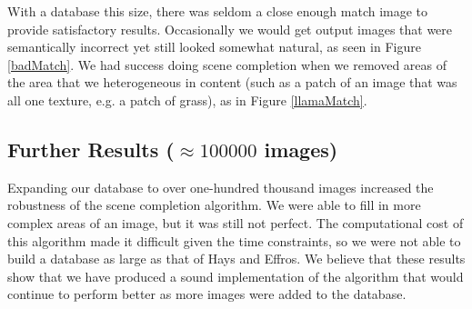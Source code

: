 \documentclass[11pt]{amsart}
\begin{document}
With a database this size, there was seldom a close enough match image to provide satisfactory results. Occasionally we would get output images that were semantically incorrect yet still looked somewhat natural, as seen in Figure \ref{badMatch}. We had success doing scene completion when we removed areas of the area that we heterogeneous in content (such as a patch of an image that was all one texture, e.g. a patch of grass), as in Figure \ref{llamaMatch}.

\subsection{Further Results ($\approx100000$ images)} 

Expanding our database to over one-hundred thousand images increased the robustness of 
the scene completion algorithm. We were able to fill in more complex areas of an image, but
it was still not perfect. The computational cost of this algorithm made it difficult given the time constraints, so we were not able to build a database as large as that of Hays and Effros. We believe 
that these results show that we have produced a sound implementation of the algorithm that would
continue to perform better as more images were added to the database.
\end{document}
